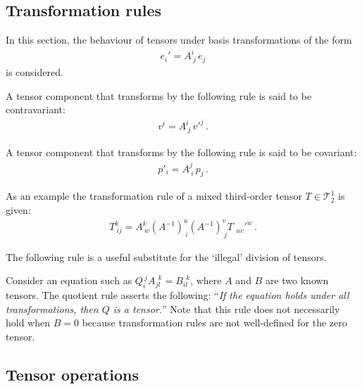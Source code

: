 \subsection{Transformation rules}

    In this section, the behaviour of tensors under basis transformations of the form
    \begin{gather}
        e_i'=A^i_{\ j}\,e_j
    \end{gather}
    is considered.

    \begin{definition}[Contravariant]\label{vector:contravariant}
        A tensor component that transforms by the following rule is said to be contravariant:
        \begin{gather}
            v^i = A^i_{\ j}\,v'^j\,.
        \end{gather}
    \end{definition}
    \begin{definition}[Covariant]\label{vector:covariant}
        A tensor component that transforms by the following rule is said to be covariant:
        \begin{gather}
            p'_i = A^j_{\ i}\,p_j\,.
        \end{gather}
    \end{definition}
    \begin{example}
        As an example the transformation rule of a mixed third-order tensor $T\in\mathcal{T}^1_2$ is given:
        \begin{gather}
            T_{\ ij}^k = A^k_{\ w}(A^{-1})^u_{\ i}(A^{-1})^v_{\ j}T_{\ \ uv}'^w\,.
        \end{gather}
    \end{example}

    The following rule is a useful substitute for the `illegal' division of tensors.
    \begin{method}
        Consider an equation such as $Q_i^{\ j}A_{jl}^{\ \ k}=B_{il}^{\ \ k}$, where $A$ and $B$ are two known tensors. The quotient rule asserts the following: ``\textit{If the equation holds under all transformations, then $Q$ is a tensor.}'' Note that this rule does not necessarily hold when $B=0$ because transformation rules are not well-defined for the zero tensor.
    \end{method}

\subsection{Tensor operations}

